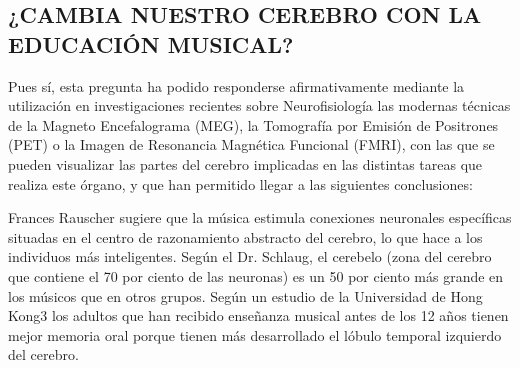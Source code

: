 \documentclass{bmcart}
\begin{document}
\subsection*{¿CAMBIA NUESTRO CEREBRO CON LA EDUCACIÓN MUSICAL?}
Pues sí, esta pregunta ha podido responderse afirmativamente mediante la utilización en investigaciones recientes sobre Neurofisiología las modernas técnicas de la Magneto Encefalograma (MEG), la Tomografía por Emisión de Positrones (PET) o la
Imagen de Resonancia Magnética Funcional (FMRI), con las que se pueden visualizar las partes del cerebro implicadas en las distintas tareas que realiza este órgano, y que han permitido llegar a las siguientes conclusiones:

Frances Rauscher sugiere que la música estimula conexiones neuronales específicas situadas en el centro de razonamiento abstracto del cerebro, lo que hace a los individuos más inteligentes.
Según el Dr. Schlaug, el cerebelo (zona del cerebro que contiene el 70 por ciento de las neuronas) es un 50 por ciento más grande en los músicos que en otros grupos.
Según un estudio de la Universidad de Hong Kong3 los adultos que han recibido enseñanza musical antes de los 12 años tienen mejor memoria oral porque tienen más desarrollado el lóbulo temporal izquierdo del cerebro.
\end{document}
